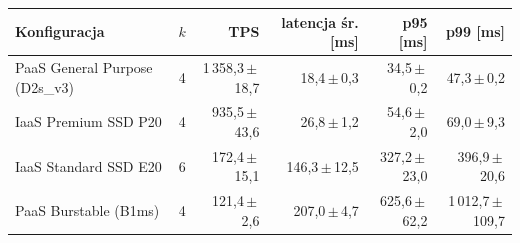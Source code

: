 \begin{tabular}{lrrrrr}
\toprule
Konfiguracja & $k$ & TPS & latencja śr. [ms] & p95 [ms] & p99 [ms] \\
\midrule
PaaS General Purpose (D2s\_v3) & 4 & 1\,358,3\,$\pm$\,18,7 & 18,4\,$\pm$\,0,3 & 34,5\,$\pm$\,0,2 & 47,3\,$\pm$\,0,2 \\
IaaS Premium SSD P20 & 4 & 935,5\,$\pm$\,43,6 & 26,8\,$\pm$\,1,2 & 54,6\,$\pm$\,2,0 & 69,0\,$\pm$\,9,3 \\
IaaS Standard SSD E20 & 6 & 172,4\,$\pm$\,15,1 & 146,3\,$\pm$\,12,5 & 327,2\,$\pm$\,23,0 & 396,9\,$\pm$\,20,6 \\
PaaS Burstable (B1ms) & 4 & 121,4\,$\pm$\,2,6 & 207,0\,$\pm$\,4,7 & 625,6\,$\pm$\,62,2 & 1\,012,7\,$\pm$\,109,7 \\
\bottomrule
\end{tabular}
